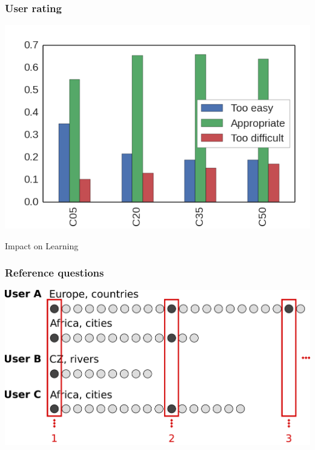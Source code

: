 \documentclass[bigger]{beamer}
\begin{document}
\begin{frame}
  \frametitle{User rating}
  \includegraphics[width=\textwidth]{img/rating_by_ab}
\end{frame}

\begin{frame}
	\begin{center}
    {\Huge Impact on Learning} 
	\end{center}
\end{frame}


\begin{frame}
  \frametitle{Reference questions}
  \includegraphics[width=\textwidth]{img/reference_answers_learning}
\end{frame}
\end{document}
